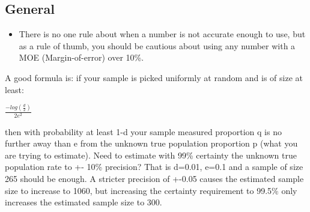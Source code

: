 \documentclass[]{book}
\providecommand{\tightlist}{%
  \setlength{\itemsep}{0pt}\setlength{\parskip}{0pt}}
\begin{document}
\subsection{General}\label{general-1}

\begin{itemize}
\tightlist
\item
  There is no one rule about when a number is not accurate enough to
  use, but as a rule of thumb, you should be cautious about using any
  number with a MOE (Margin-of-error) over 10\%.
\end{itemize}

A good formula is: if your sample is picked uniformly at random and is
of size at least:

\(\frac{-log(\frac{d}{2})}{2e^2}\)

then with probability at least 1-d your sample measured proportion q is
no further away than e from the unknown true population proportion p
(what you are trying to estimate). Need to estimate with 99\% certainty
the unknown true population rate to +- 10\% precision? That is d=0.01,
e=0.1 and a sample of size 265 should be enough. A stricter precision of
+-0.05 causes the estimated sample size to increase to 1060, but
increasing the certainty requirement to 99.5\% only increases the
estimated sample size to 300.
\end{document}
